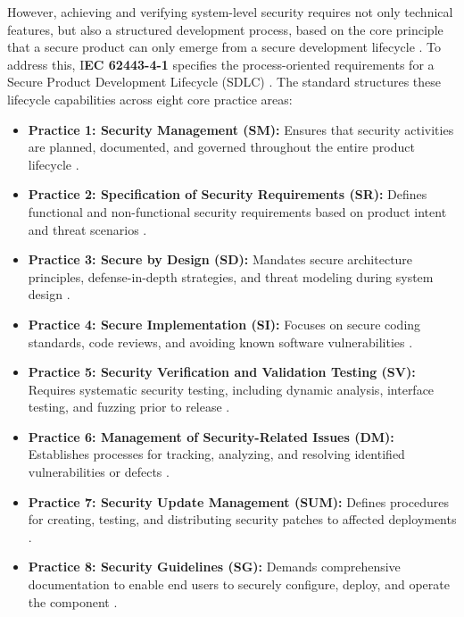 However, achieving and verifying system-level security requires not only technical features, but also a structured development process, based on the core principle that a secure product can only emerge from a secure development lifecycle \cite[pection 4.2]{DIN_EN_IEC_62443_4_1_2018}. To address this, I\textbf{EC 62443-4-1} specifies the process-oriented requirements for a Secure Product Development Lifecycle (SDLC) \cite[Chapter: Introduction]{DIN_EN_IEC_62443_4_1_2018}. The standard structures these lifecycle capabilities across eight core practice areas:
\begin{itemize}
	\item \textbf{Practice 1: Security Management (SM):} Ensures that security activities are planned, documented, and governed throughout the entire product lifecycle \cite[Chapter:  Security Management]{DIN_EN_IEC_62443_4_1_2018}.
	\item \textbf{Practice 2: Specification of Security Requirements (SR):} Defines functional and non-functional security requirements based on product intent and threat scenarios \cite[Chapter: Specification of Security Requirements]{DIN_EN_IEC_62443_4_1_2018}.
	\item \textbf{Practice 3: Secure by Design (SD):} Mandates secure architecture principles, defense-in-depth strategies, and threat modeling during system design \cite[Chapter: Secure by Design]{DIN_EN_IEC_62443_4_1_2018}.
	\item \textbf{Practice 4: Secure Implementation (SI):} Focuses on secure coding standards, code reviews, and avoiding known software vulnerabilities \cite[Chapter: Secure Implementation]{DIN_EN_IEC_62443_4_1_2018}.
	\item \textbf{Practice 5: Security Verification and Validation Testing (SV):} Requires systematic security testing, including dynamic analysis, interface testing, and fuzzing prior to release \cite[Chapter: Security Verification and Validation Testing]{DIN_EN_IEC_62443_4_1_2018}.
	\item \textbf{Practice 6: Management of Security-Related Issues (DM):} Establishes processes for tracking, analyzing, and resolving identified vulnerabilities or defects \cite[Chapter:  Management of Security-Related Issues]{DIN_EN_IEC_62443_4_1_2018}.
	\item \textbf{Practice 7: Security Update Management (SUM):} Defines procedures for creating, testing, and distributing security patches to affected deployments \cite[Chapter: Security Update Management]{DIN_EN_IEC_62443_4_1_2018}.
	\item \textbf{Practice 8: Security Guidelines (SG):} Demands comprehensive documentation to enable end users to securely configure, deploy, and operate the component \cite[Chapter: Security Guidelines]{DIN_EN_IEC_62443_4_1_2018}.
\end{itemize}

